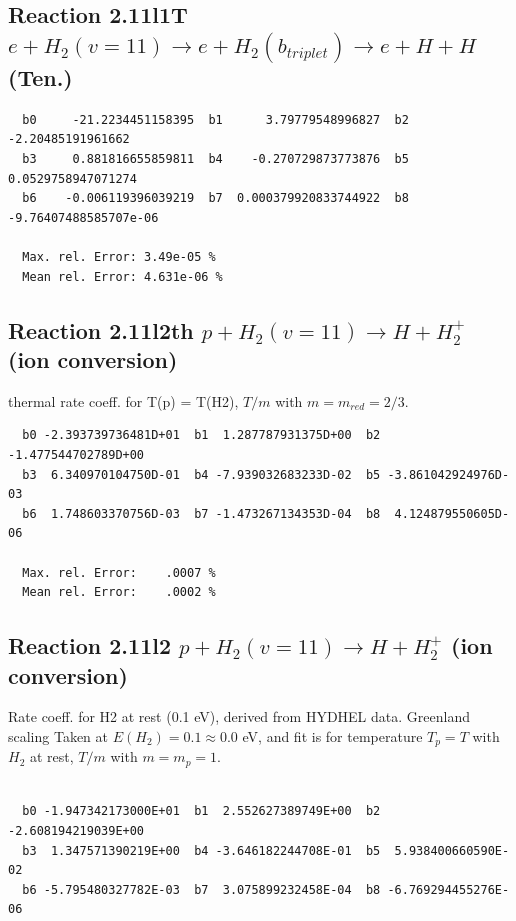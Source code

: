 \documentclass[12pt,dvipdfmx]{article}
\begin{document}
\subsection{
Reaction 2.11l1T
$  e + H_2(v=11) \rightarrow e + H_2(b_{triplet})\rightarrow e + H + H $ (Ten.)
}


\begin{small}\begin{verbatim}
  b0     -21.2234451158395  b1      3.79779548996827  b2     -2.20485191961662
  b3     0.881816655859811  b4    -0.270729873773876  b5    0.0529758947071274
  b6    -0.006119396039219  b7  0.000379920833744922  b8 -9.76407488585707e-06

  Max. rel. Error: 3.49e-05 %
  Mean rel. Error: 4.631e-06 %
\end{verbatim}\end{small}

\subsection{
Reaction 2.11l2th
$ p + H_2(v=11) \rightarrow H + H_2^+$ (ion conversion)
}
thermal rate coeff. for T(p) = T(H2),
$T/m$ with $m=m_{red}=2/3$.

\begin{small}\begin{verbatim}
  b0 -2.393739736481D+01  b1  1.287787931375D+00  b2 -1.477544702789D+00
  b3  6.340970104750D-01  b4 -7.939032683233D-02  b5 -3.861042924976D-03
  b6  1.748603370756D-03  b7 -1.473267134353D-04  b8  4.124879550605D-06

  Max. rel. Error:    .0007 %
  Mean rel. Error:    .0002 %
\end{verbatim}\end{small}

\subsection{
Reaction 2.11l2
$ p + H_2(v=11) \rightarrow H + H_2^+$ (ion conversion)
}
Rate coeff. for H2 at rest (0.1 eV), derived from HYDHEL data. Greenland scaling
Taken at $E(H_2) = 0.1 \approx 0.0$ eV,  and fit is for temperature $T_p=T$ with $H_2$ at rest,
$T/m$ with $m=m_p=1$.

\begin{small}\begin{verbatim}

  b0 -1.947342173000E+01  b1  2.552627389749E+00  b2 -2.608194219039E+00
  b3  1.347571390219E+00  b4 -3.646182244708E-01  b5  5.938400660590E-02
  b6 -5.795480327782E-03  b7  3.075899232458E-04  b8 -6.769294455276E-06

\end{verbatim}\end{small}
\end{document}
